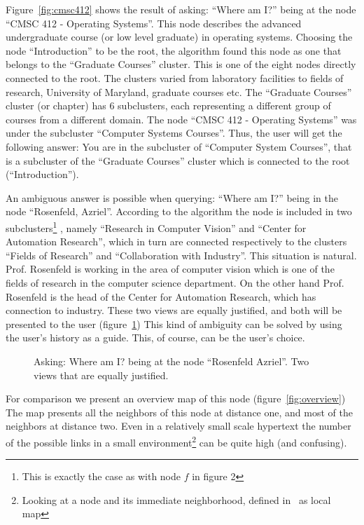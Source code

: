 \documentclass[twocolumn,10pt]{article}
\begin{document}
Figure~\ref{fig:cmsc412} shows the result of asking: ``Where am I?''
being at the node ``CMSC 412 - Operating Systems''. This node
describes the advanced undergraduate course (or low level graduate) in
operating systems. Choosing the node ``Introduction'' to be the root,
the algorithm found this node as one that belongs to the ``Graduate
Courses'' cluster. This is one of the eight nodes directly connected
to the root.  The clusters varied from laboratory facilities to fields
of research, University of Maryland, graduate courses etc.  The
``Graduate Courses'' cluster (or chapter) has 6 subclusters, each
representing a different group of courses from a different domain.
The node ``CMSC 412 - Operating Systems'' was under the subcluster
``Computer Systems Courses''. Thus, the user will get the following
answer: You are in the subcluster of ``Computer System Courses'', that
is a subcluster of the ``Graduate Courses'' cluster which is connected
to the root (``Introduction'').

An ambiguous answer is possible when querying: ``Where am I?'' being
in the node ``Rosenfeld, Azriel''. According to the algorithm the node
is included in two subclusters\footnote{This is exactly the case as
with node $f$ in figure 2} , namely ``Research in Computer Vision''
and ``Center for Automation Research'', which in turn are connected
respectively to the clusters ``Fields of Research'' and
``Collaboration with Industry''.  This situation is natural. Prof. 
Rosenfeld is working in the area of computer vision which is one of
the fields of research in the computer science department. On the
other hand Prof.  Rosenfeld is the head of the Center for Automation
Research, which has connection to industry. These two views are
equally justified, and both will be presented to the user
(figure~\ref{fig:rosenfeld}) This kind of ambiguity can be solved by
using the user's history as a guide.  This, of course, can be the
user's choice.


\begin{figure}
\vspace*{8cm}
\caption [10pt] { Asking: Where am I? being at the node ``Rosenfeld Azriel''.
Two views that are equally justified.}
\label{fig:rosenfeld}
\end{figure}

For comparison we present an overview map of this node
(figure~\ref{fig:overview}) The map presents all the neighbors of this
node at distance one, and most of the neighbors at distance two.  Even
in a relatively small scale hypertext the number of the possible links
in a small environment\footnote{Looking at a node and its immediate
neighborhood, defined in~\cite{nie90} as local map} can be quite high
(and confusing).
\end{document}

